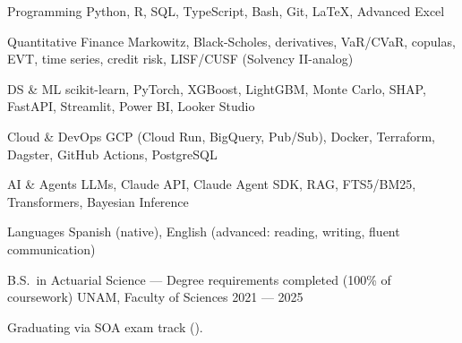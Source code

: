 \documentclass[10pt, letterpaper]{awesome-cv}
\begin{document}

\begin{cvskills}
  \cvskill
    {Programming}
    {Python, R, SQL, TypeScript, Bash, Git, \LaTeX, Advanced Excel}

  \cvskill
    {Quantitative Finance}
    {Markowitz, Black-Scholes, derivatives, VaR/CVaR, copulas, EVT, time series, credit risk, LISF/CUSF (Solvency II-analog)}

  \cvskill
    {DS \& ML}
    {scikit-learn, PyTorch, XGBoost, LightGBM, Monte Carlo, SHAP, FastAPI, Streamlit, Power BI, Looker Studio}

  \cvskill
    {Cloud \& DevOps}
    {GCP (Cloud Run, BigQuery, Pub/Sub), Docker, Terraform, Dagster, GitHub Actions, PostgreSQL}

  \cvskill
    {AI \& Agents}
    {LLMs, Claude API, Claude Agent SDK, RAG, FTS5/BM25, Transformers, Bayesian Inference}

  \cvskill
    {Languages}
    {Spanish (native), English (advanced: reading, writing, fluent communication)}
\end{cvskills}


\begin{cventries}
  \cventry
    {B.S.\ in Actuarial Science — Degree requirements completed (100\% of coursework)}
    {UNAM, Faculty of Sciences}
    {}
    {2021 — 2025}
    {
      \begin{cvitems}
        \item {Graduating via SOA exam track ().}
      \end{cvitems}
    }
\end{cventries}

\end{document}
